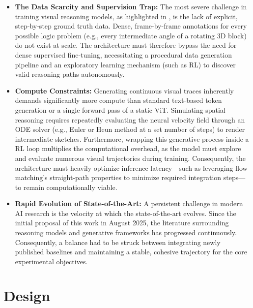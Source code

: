 \documentclass{l4proj}
\begin{document}
\begin{itemize}
    \item \textbf{The Data Scarcity and Supervision Trap:} The most severe challenge in training visual reasoning models, as highlighted in \cite{lotfi2024cos}, is the lack of explicit, step-by-step ground truth data. Dense, frame-by-frame annotations for every possible logic problem (e.g., every intermediate angle of a rotating 3D block) do not exist at scale. The architecture must therefore bypass the need for dense supervised fine-tuning, necessitating a procedural data generation pipeline and an exploratory learning mechanism (such as RL) to discover valid reasoning paths autonomously.
    \item \textbf{Compute Constraints:} Generating continuous visual traces inherently demands significantly more compute than standard text-based token generation or a single forward pass of a static ViT. Simulating spatial reasoning requires repeatedly evaluating the neural velocity field through an ODE solver (e.g., Euler or Heun method at a set number of steps) to render intermediate sketches. Furthermore, wrapping this generative process inside a RL loop multiplies the computational overhead, as the model must explore and evaluate numerous visual trajectories during training. Consequently, the architecture must heavily optimize inference latency—such as leveraging flow matching's straight-path properties to minimize required integration steps—to remain computationally viable.
    \item \textbf{Rapid Evolution of State-of-the-Art:} A persistent challenge in modern AI research is the velocity at which the state-of-the-art evolves. Since the initial proposal of this work in August 2025, the literature surrounding reasoning models and generative frameworks has progressed continuously. Consequently, a balance had to be struck between integrating newly published baselines and maintaining a stable, cohesive trajectory for the core experimental objectives.
\end{itemize}



\chapter{Design}

\end{document}
